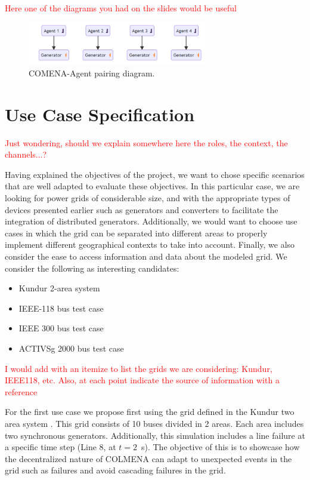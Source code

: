 \documentclass{article}
\begin{document}
\textcolor{red}{Here one of the diagrams you had on the slides would be useful}

\begin{figure}[!htb]
    \centering
    \includegraphics[width=0.7\textwidth]{pictures/colmena_pairing.png}
    \caption{COMENA-Agent pairing diagram.}
    \label{fig:diagram_pairing}
\end{figure}


\section{Use Case Specification}
\textcolor{red}{Just wondering, should we explain somewhere here the roles, the context, the channels...?}

Having explained the objectives of the project, we want to chose specific scenarios that are well adapted to evaluate these objectives. In this particular case, we are looking for power grids of considerable size, and with the appropriate types of devices presented earlier such as generators and converters to facilitate the integration of distributed generators. Additionally, we would want to choose use cases in which the grid can be separated into different areas to properly implement different geographical contexts to take into account. Finally, we also consider the ease to access information and data about the modeled grid. We consider the following as interesting candidates: 

\begin{itemize}
    \item Kundur 2-area system \cite{grids:kundur}
    \item IEEE-118 bus test case \cite{grids:ieee118} 
    \item IEEE 300 bus test case  \cite{grids:ieee300} 
    \item ACTIVSg 2000 bus test case  \cite{grids:activsg2000} 
\end{itemize}

\textcolor{red}{I would add with an itemize to list the grids we are considering: Kundur, IEEE118, etc. Also, at each point indicate the source of information with a reference}

For the first use case we propose first using the grid defined in the Kundur two area system  \cite{grids:kundur}. This grid consists of 10 buses divided in 2 areas. Each area includes two synchronous generators. Additionally, this simulation includes a line failure at a specific time step (Line 8, at $t=2$~s). The objective of this is to showcase how the decentralized nature of COLMENA can adapt to unexpected events in the grid such as failures and avoid cascading failures in the grid. 
\end{document}
